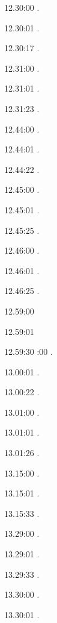 \label{key}\documentclass[italian]{article}
\begin{document}
12.30:00    .

12.30:01    .

12.30:17    .

12.31:00    .

12.31:01    .

12.31:23    .

12.44:00    .

12.44:01    .

12.44:22    .

12.45:00    .

12.45:01    .

12.45:25    .

12.46:00    .

12.46:01    .

12.46:25    .

12.59:00    

12.59:01    

12.59:30    
:00    . 

13.00:01    . 

13.00:22    . 

13.01:00     . 

13.01:01     . 

13.01:26     . 

13.15:00     . 

13.15:01     .

13.15:33     .

13.29:00     . 

13.29:01     . 

13.29:33     . 

13.30:00     .

13.30:01     .
\end{document}
